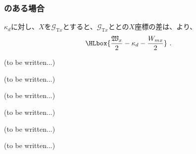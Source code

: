 \clearpage
\subsubsection{\Outcut のある場合}
\AsideKeywayDepth$\kappa_d$に対し、\TopOutcutCenter$X$を$\mathcal G_{\mathrm Tx}$とすると、$\mathcal G_{\mathrm Tx}$と\KeywayCenter との$X$座標の差は、より、
\begin{align*}
  \HLbox{\frac{\mathfrak W_x}2-\kappa_d-\frac{W_{mx}}2}\ .
\end{align*}



\clearpage
(to be written...)



(to be written...)



(to be written...)



(to be written...)


(to be written...)



\clearpage
(to be written...)
